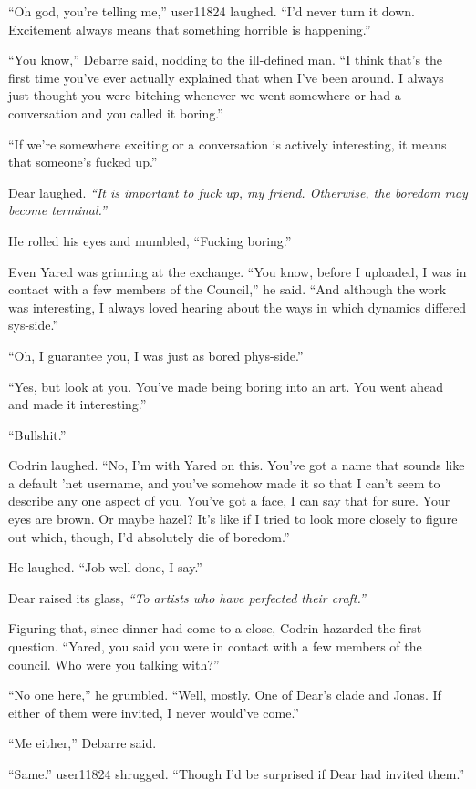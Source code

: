 ``Oh god, you're telling me,'' user11824 laughed. ``I'd never turn it down. Excitement always means that something horrible is happening.''

``You know,'' Debarre said, nodding to the ill-defined man. ``I think that's the first time you've ever actually explained that when I've been around. I always just thought you were bitching whenever we went somewhere or had a conversation and you called it boring.''

``If we're somewhere exciting or a conversation is actively interesting, it means that someone's fucked up.''

Dear laughed. \emph{``It is important to fuck up, my friend. Otherwise, the boredom may become terminal.''}

He rolled his eyes and mumbled, ``Fucking boring.''

Even Yared was grinning at the exchange. ``You know, before I uploaded, I was in contact with a few members of the Council,'' he said. ``And although the work was interesting, I always loved hearing about the ways in which dynamics differed sys-side.''

``Oh, I guarantee you, I was just as bored phys-side.''

``Yes, but look at you. You've made being boring into an art. You went ahead and made it interesting.''

``Bullshit.''

Codrin laughed. ``No, I'm with Yared on this. You've got a name that sounds like a default 'net username, and you've somehow made it so that I can't seem to describe any one aspect of you. You've got a face, I can say that for sure. Your eyes are brown. Or maybe hazel? It's like if I tried to look more closely to figure out which, though, I'd absolutely die of boredom.''

He laughed. ``Job well done, I say.''

Dear raised its glass, \emph{``To artists who have perfected their craft.''}

Figuring that, since dinner had come to a close, Codrin hazarded the first question. ``Yared, you said you were in contact with a few members of the council. Who were you talking with?''

``No one here,'' he grumbled. ``Well, mostly. One of Dear's clade and Jonas. If either of them were invited, I never would've come.''

``Me either,'' Debarre said.

``Same.'' user11824 shrugged. ``Though I'd be surprised if Dear had invited them.''


